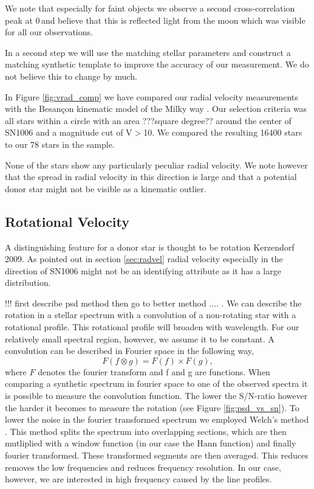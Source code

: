 We note that especially for faint objects we observe a second cross-correlation peak at 0\,\kms and believe that this is reflected light from the moon which was visible for all our observations. 

In a second step we will use the matching stellar parameters and construct a matching synthetic template to improve the accuracy of our measurement. We do not believe this to change by much. 

In Figure \ref{fig:vrad_comp} we have compared our radial velocity measurements with the Besan\c{c}on kinematic model of the Milky way \citep{2003A&A...409..523R}. Our selection criteria was all stars within a circle with an area ???square degree?? around the center of SN1006 and a magnitude cut of V$>$10. We compared the resulting 16400 stars to our 78 stars in the sample. 
 
None of the stars show any particularly peculiar radial velocity. We note however that the spread in radial velocity in this direction is large and that a potential donor star might not be visible as a kinematic outlier. 

\subsection{Rotational Velocity}
A distinguishing feature for a donor star is thought to be rotation Kerzendorf 2009. As pointed out in section \ref{sec:radvel} radial velocity especially in the direction of SN1006 might not be an identifying attribute as it has a large distribution. 

!!! first describe psd method then go to better method .... .
We can describe the rotation in a stellar spectrum with a convolution of a non-rotating star with a rotational profile. This rotational profile will broaden with wavelength. For our relatively small spectral region, however, we assume it to be constant. 
A convolution can be described in Fourier space in the following way,
\[
	F(f \otimes g) = F(f) \times F(g), 
\]
where $F$ denotes the fourier transform and f and g are functions. When comparing a synthetic spectrum in fourier space to one of the observed spectra it is possible to measure the convolution function. The lower the S/N-ratio however the harder it becomes to measure the rotation (see Figure \ref{fig:psd_vs_sn}). To lower the noise in the fourier transformed spectrum we employed Welch's method \cite{1967ITAE...15...70W}. This method splits the spectrum into overlapping sections, which are then mutliplied with a window function (in our case the Hann function) and finally fourier transformed. These transformed segments are then averaged. This reduces removes the low frequencies and reduces frequency resolution. In our case, however, we are interested in high frequency caused by the line profiles. 


